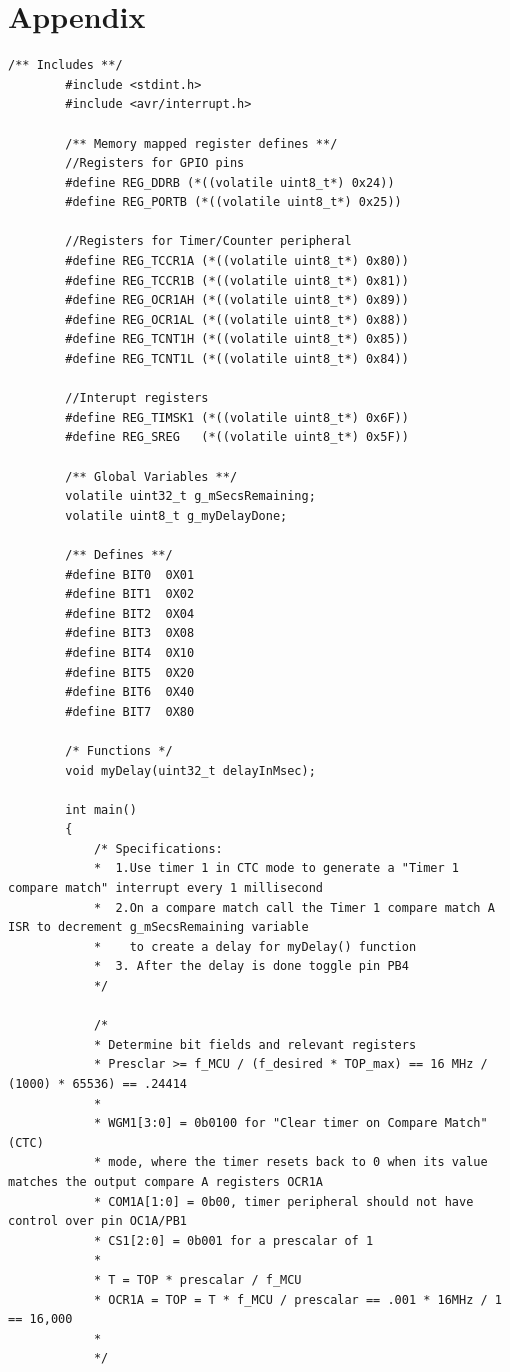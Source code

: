 \documentclass[11pt,pdftex,portrait,letterpaper]{article}
\begin{document}
	\pagebreak
	
	
	\section{Appendix}
	
	\begin{lstlisting}[caption={Program 1}, label=l:programx]
		/** Includes **/
		#include <stdint.h>
		#include <avr/interrupt.h>
		
		/** Memory mapped register defines **/
		//Registers for GPIO pins
		#define REG_DDRB (*((volatile uint8_t*) 0x24))
		#define REG_PORTB (*((volatile uint8_t*) 0x25))
		
		//Registers for Timer/Counter peripheral
		#define REG_TCCR1A (*((volatile uint8_t*) 0x80))
		#define REG_TCCR1B (*((volatile uint8_t*) 0x81))
		#define REG_OCR1AH (*((volatile uint8_t*) 0x89))
		#define REG_OCR1AL (*((volatile uint8_t*) 0x88))
		#define REG_TCNT1H (*((volatile uint8_t*) 0x85))
		#define REG_TCNT1L (*((volatile uint8_t*) 0x84))
		
		//Interupt registers
		#define REG_TIMSK1 (*((volatile uint8_t*) 0x6F))
		#define REG_SREG   (*((volatile uint8_t*) 0x5F))
		
		/** Global Variables **/
		volatile uint32_t g_mSecsRemaining;
		volatile uint8_t g_myDelayDone;
		
		/** Defines **/
		#define BIT0  0X01
		#define BIT1  0X02
		#define BIT2  0X04
		#define BIT3  0X08
		#define BIT4  0X10
		#define BIT5  0X20
		#define BIT6  0X40
		#define BIT7  0X80
		
		/* Functions */
		void myDelay(uint32_t delayInMsec);
		
		int main()
		{
			/* Specifications:
			*  1.Use timer 1 in CTC mode to generate a "Timer 1 compare match" interrupt every 1 millisecond
			*  2.On a compare match call the Timer 1 compare match A ISR to decrement g_mSecsRemaining variable
			*    to create a delay for myDelay() function
			*  3. After the delay is done toggle pin PB4
			*/
			
			/*
			* Determine bit fields and relevant registers
			* Presclar >= f_MCU / (f_desired * TOP_max) == 16 MHz / (1000) * 65536) == .24414
			* 
			* WGM1[3:0] = 0b0100 for "Clear timer on Compare Match" (CTC)
			* mode, where the timer resets back to 0 when its value matches the output compare A registers OCR1A
			* COM1A[1:0] = 0b00, timer peripheral should not have control over pin OC1A/PB1
			* CS1[2:0] = 0b001 for a prescalar of 1
			* 
			* T = TOP * prescalar / f_MCU
			* OCR1A = TOP = T * f_MCU / prescalar == .001 * 16MHz / 1 == 16,000
			* 
			*/
			

\end{lstlisting}
\end{document}
